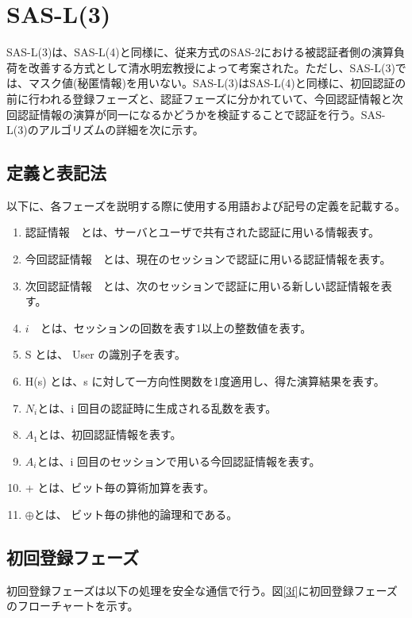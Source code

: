 \documentclass{thesis}
\begin{document}
\section{SAS-L(3)}\label{SAS-L(3)}
SAS-L(3)は、SAS-L(4)と同様に、従来方式のSAS-2における被認証者側の演算負荷を改善する方式として清水明宏教授によって考案された。ただし、SAS-L(3)では、マスク値(秘匿情報)を用いない。SAS-L(3)はSAS-L(4)と同様に、初回認証の前に行われる登録フェーズと、認証フェーズに分かれていて、今回認証情報と次回認証情報の演算が同一になるかどうかを検証することで認証を行う。SAS-L(3)のアルゴリズムの詳細を次に示す。

\subsection{定義と表記法}
以下に、各フェーズを説明する際に使用する用語および記号の定義を記載する。
\begin{enumerate}[・]
				\item 認証情報　とは、サーバとユーザで共有された認証に用いる情報表す。
				\item 今回認証情報　とは、現在のセッションで認証に用いる認証情報を表す。
				\item 次回認証情報　とは、次のセッションで認証に用いる新しい認証情報を表す。
				\item $i$　とは、セッションの回数を表す1以上の整数値を表す。
				\item S とは、 User の識別子を表す。
				\item H(s) とは、s に対して一方向性関数を1度適用し、得た演算結果を表す。
				\item $N_i$とは、i 回目の認証時に生成される乱数を表す。
				\item $A_1$とは、初回認証情報を表す。
				\item $A_i$とは、i 回目のセッションで用いる今回認証情報を表す。
				\item + とは、ビット毎の算術加算を表す。
				\item $\oplus$とは、 ビット毎の排他的論理和である。
\end{enumerate}
\subsection{初回登録フェーズ}
初回登録フェーズは以下の処理を安全な通信で行う。図\ref{3f}に初回登録フェーズのフローチャートを示す。
\end{document}
